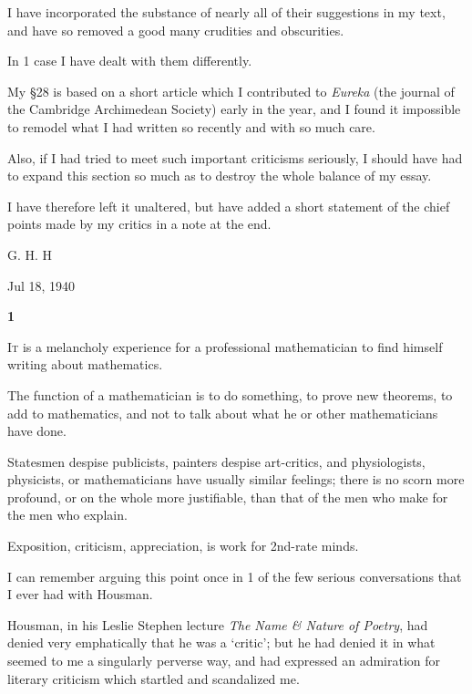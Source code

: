\documentclass{article}
\numberwithin{equation}{section}
\begin{document}
I have incorporated the substance of nearly all of their suggestions in my text, and have so removed a good many crudities and obscurities.

%
In 1 case I have dealt with them differently.

My \S28 is based on a short article which I contributed to \textit{Eureka} (the journal of the Cambridge Archimedean Society) early in the year, and I found it impossible to remodel what I had written so recently and with so much care.

Also, if I had tried to meet such important criticisms seriously, I should have had to expand this section so much as to destroy the whole balance of my essay.

I have therefore left it unaltered, but have added a short statement of the chief points made by my critics in a note at the end.

\begin{flushright}
    G. H. H
    
    Jul 18, 1940
\end{flushright}


\begin{center}
    \large\textbf{1}
\end{center}
\textsc{It} is a melancholy experience for a professional mathematician to find himself writing about mathematics.

The function of a mathematician is to do something, to prove new theorems, to add to mathematics, and not to talk about what he or other mathematicians have done.

Statesmen despise publicists, painters despise art-critics, and physiologists, physicists, or mathematicians have usually similar feelings; there is no scorn more profound, or on the whole more justifiable, than that of the men who make for the men who explain.

Exposition, criticism, appreciation, is work for 2nd-rate minds.

%
I can remember arguing this point once in 1 of the few serious conversations that I ever had with Housman.

Housman, in his Leslie Stephen lecture \textit{The Name \& Nature of Poetry}, had denied very emphatically that he was a `critic'; but he had denied it in what seemed to me a singularly perverse way, and had expressed an admiration for literary criticism which startled and scandalized me.
\end{document}
